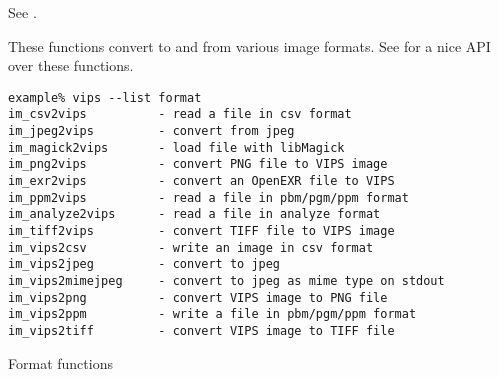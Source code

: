 See .

These functions convert to and from various image formats. See
 for a nice API over these functions.

\begin{fig2}
\begin{verbatim}
example% vips --list format
im_csv2vips          - read a file in csv format
im_jpeg2vips         - convert from jpeg
im_magick2vips       - load file with libMagick
im_png2vips          - convert PNG file to VIPS image
im_exr2vips          - convert an OpenEXR file to VIPS
im_ppm2vips          - read a file in pbm/pgm/ppm format
im_analyze2vips      - read a file in analyze format
im_tiff2vips         - convert TIFF file to VIPS image
im_vips2csv          - write an image in csv format
im_vips2jpeg         - convert to jpeg
im_vips2mimejpeg     - convert to jpeg as mime type on stdout
im_vips2png          - convert VIPS image to PNG file
im_vips2ppm          - write a file in pbm/pgm/ppm format
im_vips2tiff         - convert VIPS image to TIFF file
\end{verbatim}
\caption{Format functions}
\label{fg:format}
\end{fig2}
